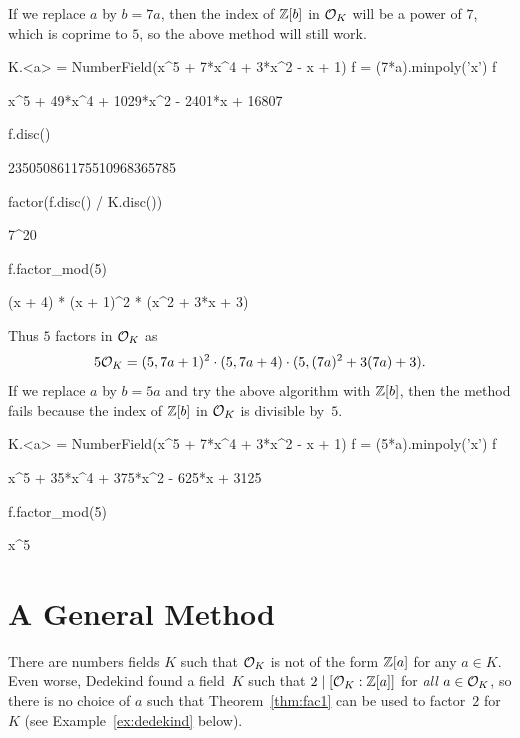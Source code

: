 If we replace $a$ by $b=7a$, then the index of $\mathbb{Z}[b]$
in $\mathcal{O}_K$ will be a power of $7$, which is coprime to $5$,
so the above method will still work.
\begin{sagecode}
\begin{sagecell}
K.<a> = NumberField(x^5 + 7*x^4 + 3*x^2 - x + 1)
f = (7*a).minpoly('x')
f
\end{sagecell}
\begin{sageout}
x^5 + 49*x^4 + 1029*x^2 - 2401*x + 16807
\end{sageout}
\begin{sagecell}
f.disc()
\end{sagecell}
\begin{sageout}
235050861175510968365785
\end{sageout}
\begin{sagecell}
factor(f.disc() / K.disc())
\end{sagecell}
\begin{sageout}
7^20
\end{sageout}
\begin{sagecell}
f.factor_mod(5)
\end{sagecell}
\begin{sageout}
(x + 4) * (x + 1)^2 * (x^2 + 3*x + 3)
\end{sageout}
\end{sagecode}
Thus $5$ factors in $\mathcal{O}_K$
as
$$
  5\mathcal{O}_K = (5, 7a+1)^2 \cdot (5, 7a+4) \cdot (5, (7a)^2 + 3(7a) + 3).
$$
If we replace $a$ by $b=5a$ and try the above algorithm with $\mathbb{Z}[b]$,
then the method fails because the index of $\mathbb{Z}[b]$ in $\mathcal{O}_K$ is divisible
by~$5$.
\begin{sagecode}
\begin{sagecell}
K.<a> = NumberField(x^5 + 7*x^4 + 3*x^2 - x + 1)
f = (5*a).minpoly('x')
f
\end{sagecell}
\begin{sageout}
x^5 + 35*x^4 + 375*x^2 - 625*x + 3125
\end{sageout}
\begin{sagecell}
f.factor_mod(5)
\end{sagecell}
\begin{sageout}
x^5
\end{sageout}
\end{sagecode}

\section{A General Method}
There are numbers fields $K$ such that $\mathcal{O}_K$ is not of the form
$\mathbb{Z}[a]$ for any $a\in K$.  Even worse, Dedekind found a
field~$K$ such that $2\mid [\mathcal{O}_K : \mathbb{Z}[a]]$ for {\em all}
$a\in \mathcal{O}_K$, so there is no choice of $a$ such that
Theorem~\ref{thm:fac1} can be used to factor~$2$ for $K$ (see
Example~\ref{ex:dedekind} below).

